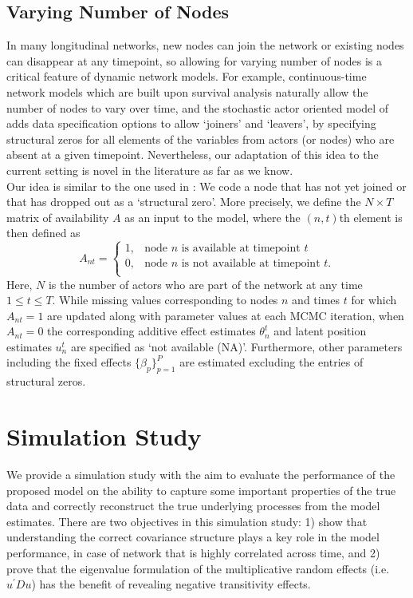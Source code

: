 \documentclass[a4paper]{article}
\begin{document}
\subsection{Varying Number of Nodes}\label{subsec: varying number of nodes}
In many longitudinal networks, new nodes can join the network or existing nodes can disappear at any timepoint, so allowing for varying number of nodes is a critical feature of dynamic network models. For example, continuous-time network models which are built upon survival analysis \citep{butts2008relational,vu2011continuous} naturally allow the number of nodes to vary over time, and the stochastic actor oriented model of \cite{snijders2010introduction} adds data specification options to allow `joiners' and `leavers', by specifying structural zeros for all elements of the variables from actors (or nodes) who are absent at a given timepoint. Nevertheless, our adaptation of this idea to the current setting is novel in the literature as far as we know.\\ \newline
Our idea is similar to the one used in \cite{snijders2010introduction}: We code a node that has not yet joined or that has dropped out as a `structural zero'. More precisely, we define the $N\times T$ matrix of availability $A$ as an input to the model, where the $(n, t)${th} element is then defined as
\begin{equation*}
A_{nt} =\begin{cases}
1, & \mbox{node $n$ is available at timepoint $t$}\\
0, & \mbox{node $n$ is not available at timepoint $t$.}\\
\end{cases}
\end{equation*}
Here, $N$ is the number of actors who are part of the network at any time $1\leq t \leq T$. While missing values corresponding to nodes $n$ and times $t$ for which $A_{nt} = 1$ are updated along with parameter values at each MCMC iteration, when $A_{nt} = 0$ the corresponding additive effect estimates $\theta^t_{n}$ and latent position estimates $u^t_{n}$ are specified as `not available (NA)'. Furthermore, other parameters including the fixed effects $\{\beta_{p}\}_{p=1}^P$ are estimated excluding the entries of structural zeros. 

\section{Simulation Study}\label{sec: simulation study}
We provide a simulation study with the aim to evaluate the performance of the proposed model on the ability to capture some important properties of the true data and correctly reconstruct the true underlying processes from the model estimates. There are two objectives in this simulation study: 1) show that understanding the correct covariance structure plays a key role in the model performance, in case of network that is highly correlated across time, and 2) prove that the eigenvalue formulation of the multiplicative random effects (i.e. $u^\prime Du$) has the benefit of revealing negative transitivity effects.
\end{document}
